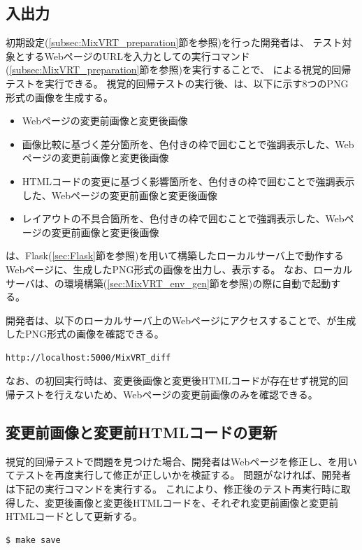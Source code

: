 \subsection{入出力}\label{subsec:MixVRT_IO}
初期設定(\ref{subsec:MixVRT_preparation}節を参照)を行った開発者は、
テスト対象とするWebページのURLを入力として\toolName の実行コマンド(\ref{subsec:MixVRT_preparation}節を参照)を実行することで、
\toolName による視覚的回帰テストを実行できる。
視覚的回帰テストの実行後、\toolName は、以下に示す8つのPNG形式の画像を生成する。
\begin{itemize}
    \item Webページの変更前画像と変更後画像
    \item 画像比較に基づく差分箇所を、色付きの枠で囲むことで強調表示した、Webページの変更前画像と変更後画像
    \item HTMLコードの変更に基づく影響箇所を、色付きの枠で囲むことで強調表示した、Webページの変更前画像と変更後画像
    \item レイアウトの不具合箇所を、色付きの枠で囲むことで強調表示した、Webページの変更前画像と変更後画像
\end{itemize}
\toolName は、Flask(\ref{sec:Flask}節を参照)を用いて構築したローカルサーバ上で動作するWebページに、生成したPNG形式の画像を出力し、表示する。
なお、ローカルサーバは、\toolName の環境構築(\ref{sec:MixVRT_env_gen}節を参照)の際に自動で起動する。
\par
開発者は、以下のローカルサーバ上のWebページにアクセスすることで、\toolName が生成したPNG形式の画像を確認できる。
\begin{lstlisting}[label=list:command3,frame=none,numbers=none,basicstyle={\normalsize \ttfamily \color[gray]{.15}}]
    http://localhost:5000/MixVRT_diff
   \end{lstlisting}
なお、\toolName の初回実行時は、変更後画像と変更後HTMLコードが存在せず視覚的回帰テストを行えないため、Webページの変更前画像のみを確認できる。

\subsection{変更前画像と変更前HTMLコードの更新}\label{subsec:MixVRT_evaluate}
視覚的回帰テストで問題を見つけた場合、開発者はWebページを修正し、\toolName を用いてテストを再度実行して修正が正しいかを検証する。
問題がなければ、開発者は下記の実行コマンドを実行する。
これにより、修正後のテスト再実行時に取得した、変更後画像と変更後HTMLコードを、それぞれ変更前画像と変更前HTMLコードとして更新する。
\begin{lstlisting}[label=list:command2,frame=none,numbers=none,basicstyle={\normalsize \ttfamily \color[gray]{.15}}]
    $ make save
\end{lstlisting}

